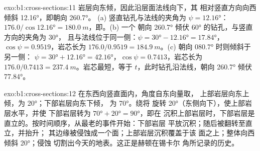 \begin{solution}{exo:b1:cross-sections:11}
岩层向东倾，因此沿层面法线向下，其
相对竖直方向向西倾斜 \ang{12.16}，即朝向 \ang{260.7}。
(a) 竖直钻孔与法线的夹角为 $\psi = \ang{12.16}$：
$176.0/\cos\ang{12.16} = \qty{180.0}{m}$，即。(b) 一个
朝向 \ang{260.7} 倾伏 \ang{60} 的钻孔，与竖直方向的夹角为 \ang{30}，
且与法线位于同一侧：$\psi = \ang{30} - \ang{12.16} =
\ang{17.84}$，$\cos\psi = 0.9519$，岩芯长为 $176.0/0.9519 =
\qty{184.9}{m}$。(c) 朝向 \ang{080.7} 时则倾斜于另一侧：
$\psi = \ang{30} + \ang{12.16} = \ang{42.16}$，$\cos\psi = 0.7413$，岩芯长为
$176.0/0.7413 = \qty{237.4}{m}$。岩芯最短，等于
$t$，此时钻孔沿法线，朝向
\ang{260.7} 倾伏 \ang{77.84}。
\end{solution}

\begin{solution}{exo:b1:cross-sections:12}
在东西向竖直面内，角度自东向量取，
上部岩层向东上倾，为 \ang{20}；下部岩层向东下倾，
为 \ang{70}。绕将
旋转 \ang{20}（东侧向下），使上部岩层水平，并使
下部岩层转为 $\ang{70} + \ang{20} = \ang{90}$，即在
沉积上部岩层时，下部岩层是直立的。按时间顺序，从最老的事件开始：下部岩层
平放沉积；随后被翻转至直立，并抬升；
其边缘被侵蚀成一个面；上部岩层沉积覆盖于该
面之上；整体向西倾斜 \ang{20}；侵蚀
切割出今天的地表。这正是赫顿在锡卡尔
角所记录的历史。
\end{solution}


